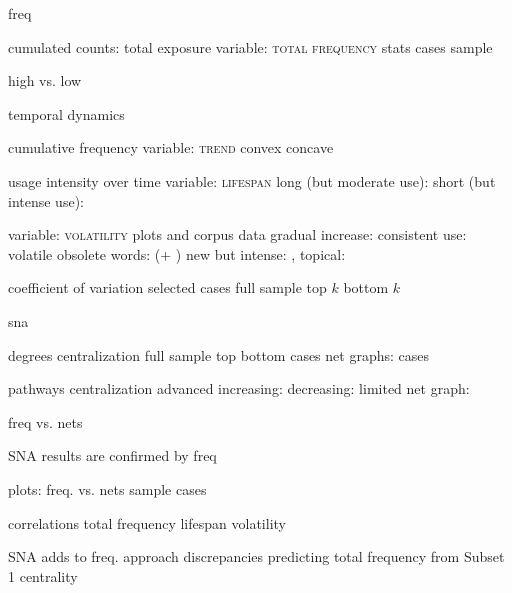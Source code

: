 
freq

  cumulated counts: total exposure
    variable: \textsc{total frequency}
    stats
      cases
      sample

    high vs. low

  temporal dynamics

    cumulative frequency
      variable: \textsc{trend}
        convex
        concave

    usage intensity over time
      variable: \textsc{lifespan}
        long (but moderate use): 
        short (but intense use): 

      variable: \textsc{volatility}
        plots and corpus data
          gradual increase: 
          consistent use: 
          volatile
            obsolete words:  (+ )
            new but intense: , 
            topical: 

        coefficient of variation
          selected cases
          full sample
            top $k$
            bottom $k$

sna

  degrees
    centralization
      full sample
        top
        bottom
      cases
    net graphs: cases

  pathways
    centralization
      advanced
      increasing:
      decreasing:
      limited
    net graph: 

freq vs. nets

  SNA results are confirmed by freq

    plots: freq. vs. nets
      sample
      cases


    correlations
      total frequency
      lifespan
      volatility


  SNA adds to freq. approach
    discrepancies
    predicting total frequency from Subset 1 centrality

